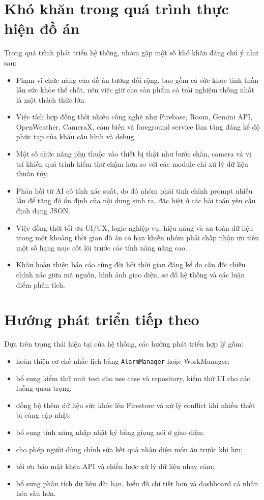 \documentclass{zenbuddy-report}
\begin{document}
\section{Khó khăn trong quá trình thực hiện đồ án}
Trong quá trình phát triển hệ thống, nhóm gặp một số khó khăn đáng chú ý như sau:
\begin{itemize}
  \item Phạm vi chức năng của đồ án tương đối rộng, bao gồm cả sức khỏe tinh thần lẫn sức khỏe thể chất, nên việc giữ cho sản phẩm có trải nghiệm thống nhất là một thách thức lớn.
  \item Việc tích hợp đồng thời nhiều công nghệ như Firebase, Room, Gemini API, OpenWeather, CameraX, cảm biến và foreground service làm tăng đáng kể độ phức tạp của khâu cấu hình và debug.
  \item Một số chức năng phụ thuộc vào thiết bị thật như bước chân, camera và vị trí khiến quá trình kiểm thử chậm hơn so với các module chỉ xử lý dữ liệu thuần túy.
  \item Phản hồi từ AI có tính xác suất, do đó nhóm phải tinh chỉnh prompt nhiều lần để tăng độ ổn định của nội dung sinh ra, đặc biệt ở các bài toán yêu cầu định dạng JSON.
  \item Việc đồng thời tối ưu UI/UX, logic nghiệp vụ, hiệu năng và an toàn dữ liệu trong một khoảng thời gian đồ án có hạn khiến nhóm phải chấp nhận ưu tiên một số hạng mục cốt lõi trước các tính năng nâng cao.
  \item Khâu hoàn thiện báo cáo cũng đòi hỏi thời gian đáng kể do cần đối chiếu chính xác giữa mã nguồn, hình ảnh giao diện, sơ đồ hệ thống và các luận điểm phân tích.
\end{itemize}

\section{Hướng phát triển tiếp theo}
Dựa trên trạng thái hiện tại của hệ thống, các hướng phát triển hợp lý gồm:
\begin{itemize}
  \item hoàn thiện cơ chế nhắc lịch bằng \texttt{AlarmManager} hoặc WorkManager;
  \item bổ sung kiểm thử unit test cho use case và repository, kiểm thử UI cho các luồng quan trọng;
  \item đồng bộ thêm dữ liệu sức khỏe lên Firestore và xử lý conflict khi nhiều thiết bị cùng cập nhật;
  \item bổ sung tính năng nhập nhật ký bằng giọng nói ở giao diện;
  \item cho phép người dùng chỉnh sửa kết quả nhận diện món ăn trước khi lưu;
  \item tối ưu bảo mật khóa API và chiến lược xử lý dữ liệu nhạy cảm;
  \item bổ sung phân tích dữ liệu dài hạn, biểu đồ chi tiết hơn và dashboard cá nhân hóa sâu hơn.
\end{itemize}
\end{document}
